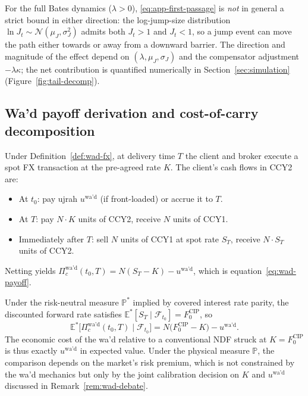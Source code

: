 \documentclass[preprint,12pt,authoryear]{elsarticle}
\newcommand{\EE}{\mathbb{E}}
\newcommand{\PP}{\mathbb{P}}
\newcommand{\FF}{\mathcal{F}}
\theoremstyle{definition}
\begin{document}
For the full Bates dynamics ($\lambda > 0$),
\eqref{eq:app-first-passage} is \emph{not} in general a strict
bound in either direction: the log-jump-size distribution
$\ln J_t \sim \mathcal{N}(\mu_J, \sigma_J^2)$ admits both
$J_t > 1$ and $J_t < 1$, so a jump event can move the path
either towards or away from a downward barrier. The direction
and magnitude of the effect depend on
$(\lambda, \mu_J, \sigma_J)$ and the compensator adjustment
$-\lambda\kappa$; the net contribution is quantified numerically
in Section~\ref{sec:simulation} (Figure~\ref{fig:tail-decomp}).

\subsection{Wa'd payoff derivation and cost-of-carry decomposition}
\label{app:wad}

Under Definition~\ref{def:wad-fx}, at delivery time $T$ the
client and broker execute a spot FX transaction at the pre-agreed
rate $K$. The client's cash flows in CCY2 are:
\begin{itemize}
    \item At $t_0$: pay ujrah $u^{\text{wa'd}}$ (if front-loaded)
    or accrue it to $T$.
    \item At $T$: pay $N \cdot K$ units of CCY2, receive $N$
    units of CCY1.
    \item Immediately after $T$: sell $N$ units of CCY1 at spot
    rate $S_T$, receive $N \cdot S_T$ units of CCY2.
\end{itemize}
Netting yields $\Pi^{\text{wa'd}}_c(t_0, T) = N (S_T - K)
- u^{\text{wa'd}}$, which is
equation~\eqref{eq:wad-payoff}.

Under the risk-neutral measure $\PP^{*}$ implied by covered
interest rate parity, the discounted forward rate satisfies
$\EE^{*}[S_T \mid \FF_{t_0}] = F^{\text{CIP}}_0$, so
\begin{equation}
    \EE^{*}\bigl[ \Pi^{\text{wa'd}}_c(t_0, T) \mid \FF_{t_0} \bigr]
    = N \bigl( F^{\text{CIP}}_0 - K \bigr) - u^{\text{wa'd}}.
    \label{eq:app-wad-riskneutral}
\end{equation}
The economic cost of the wa'd relative to a conventional NDF
struck at $K = F^{\text{CIP}}_0$ is thus exactly $u^{\text{wa'd}}$
in expected value. Under the physical measure $\PP$, the
comparison depends on the market's risk premium, which is not
constrained by the wa'd mechanics but only by the joint
calibration decision on $K$ and $u^{\text{wa'd}}$ discussed in
Remark~\ref{rem:wad-debate}.
\end{document}
